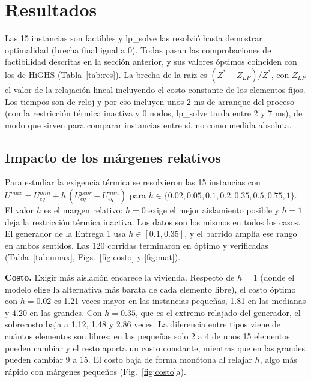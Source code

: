 
\section{Resultados}
Las 15 instancias son factibles y lp\_solve las resolvió hasta demostrar optimalidad (brecha final igual a 0). Todas pasan las comprobaciones de factibilidad descritas en la sección anterior, y sus valores óptimos coinciden con los de HiGHS (Tabla~\ref{tab:res}). La brecha de la raíz es $(Z^{*} - Z_{LP})/Z^{*}$, con $Z_{LP}$ el valor de la relajación lineal incluyendo el costo constante de los elementos fijos. Los tiempos son de reloj y por eso incluyen unos 2 ms de arranque del proceso (con la restricción térmica inactiva y 0 nodos, lp\_solve tarda entre 2 y 7 ms), de modo que sirven para comparar instancias entre sí, no como medida absoluta.

\begin{table}[htbp]
\centering
\footnotesize

\caption{Resultados de las 15 instancias ($Z^{*}$ en millones de pesos; $U$ obt. es la transmitancia ponderada de la solución; Verif. indica que pasó las comprobaciones propias y coincide con HiGHS).}
\label{tab:res}
\end{table}

\subsection{Impacto de los márgenes relativos}
Para estudiar la exigencia térmica se resolvieron las 15 instancias con $U^{max} = U_{eq}^{min} + h\,(U_{eq}^{peor} - U_{eq}^{min})$ para $h \in \{0.02, 0.05, 0.1, 0.2, 0.35, 0.5, 0.75, 1\}$. El valor $h$ es el margen relativo: $h=0$ exige el mejor aislamiento posible y $h=1$ deja la restricción térmica inactiva. Los datos son los mismos en todos los casos. El generador de la Entrega 1 usa $h \in [0.1, 0.35]$, y el barrido amplía ese rango en ambos sentidos. Las 120 corridas terminaron en óptimo y verificadas (Tabla~\ref{tab:umax}, Figs.~\ref{fig:costo} y \ref{fig:mat}).

\textbf{Costo.} Exigir más aislación encarece la vivienda. Respecto de $h=1$ (donde el modelo elige la alternativa más barata de cada elemento libre), el costo óptimo con $h=0.02$ es 1.21 veces mayor en las instancias pequeñas, 1.81 en las medianas y 4.20 en las grandes. Con $h=0.35$, que es el extremo relajado del generador, el sobrecosto baja a 1.12, 1.48 y 2.86 veces. La diferencia entre tipos viene de cuántos elementos son libres: en las pequeñas solo 2 a 4 de unos 15 elementos pueden cambiar y el resto aporta un costo constante, mientras que en las grandes pueden cambiar 9 a 15. El costo baja de forma monótona al relajar $h$, algo más rápido con márgenes pequeños (Fig.~\ref{fig:costo}a).

